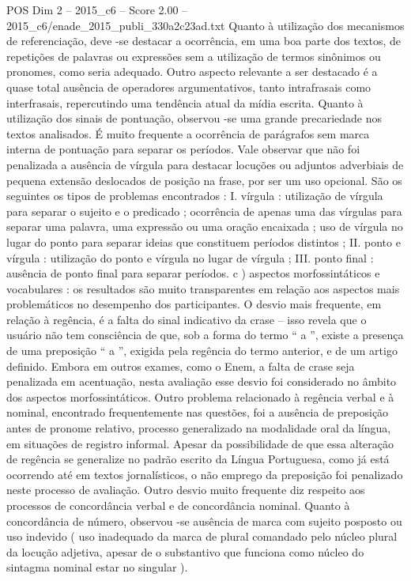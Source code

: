 \begin{textsample}{POS Dim 2 – 2015\_c6 – Score 2.00 – 2015\_c6/enade\_2015\_publi\_330a2c23ad.txt}
Quanto à utilização dos mecanismos de referenciação, deve -se destacar a ocorrência, em uma boa parte dos textos, de repetições de palavras ou expressões sem a utilização de termos sinônimos ou pronomes, como seria adequado.
Outro aspecto relevante a ser destacado é a quase total ausência de operadores argumentativos, tanto intrafrasais como interfrasais, repercutindo uma tendência atual da mídia escrita.
Quanto à utilização dos sinais de pontuação, observou -se uma grande precariedade nos textos analisados.
É muito frequente a ocorrência de parágrafos sem marca interna de pontuação para separar os períodos.
Vale observar que não foi penalizada a ausência de vírgula para destacar locuções ou adjuntos adverbiais de pequena extensão deslocados de posição na frase, por ser um uso opcional.
São os seguintes os tipos de problemas encontrados : I. vírgula : utilização de vírgula para separar o sujeito e o predicado ; ocorrência de apenas uma das vírgulas para separar uma palavra, uma expressão ou uma oração encaixada ; uso de vírgula no lugar do ponto para separar ideias que constituem períodos distintos ; II. ponto e vírgula : utilização do ponto e vírgula no lugar de vírgula ; III. ponto final : ausência de ponto final para separar períodos. c ) aspectos morfossintáticos e vocabulares : os resultados são muito transparentes em relação aos aspectos mais problemáticos no desempenho dos participantes.
O desvio mais frequente, em relação à regência, é a falta do sinal indicativo da crase – isso revela que o usuário não tem consciência de que, sob a forma do termo “ a ”, existe a presença de uma preposição “ a ”, exigida pela regência do termo anterior, e de um artigo definido.
Embora em outros exames, como o Enem, a falta de crase seja penalizada em acentuação, nesta avaliação esse desvio foi considerado no âmbito dos aspectos morfossintáticos.
Outro problema relacionado à regência verbal e à nominal, encontrado frequentemente nas questões, foi a ausência de preposição antes de pronome relativo, processo generalizado na modalidade oral da língua, em situações de registro informal.
Apesar da possibilidade de que essa alteração de regência se generalize no padrão escrito da Língua Portuguesa, como já está ocorrendo até em textos jornalísticos, o não emprego da preposição foi penalizado neste processo de avaliação.
Outro desvio muito frequente diz respeito aos processos de concordância verbal e de concordância nominal.
Quanto à concordância de número, observou -se ausência de marca com sujeito posposto ou uso indevido ( uso inadequado da marca de plural comandado pelo núcleo plural da locução adjetiva, apesar de o substantivo que funciona como núcleo do sintagma nominal estar no singular ).

\end{textsample}
